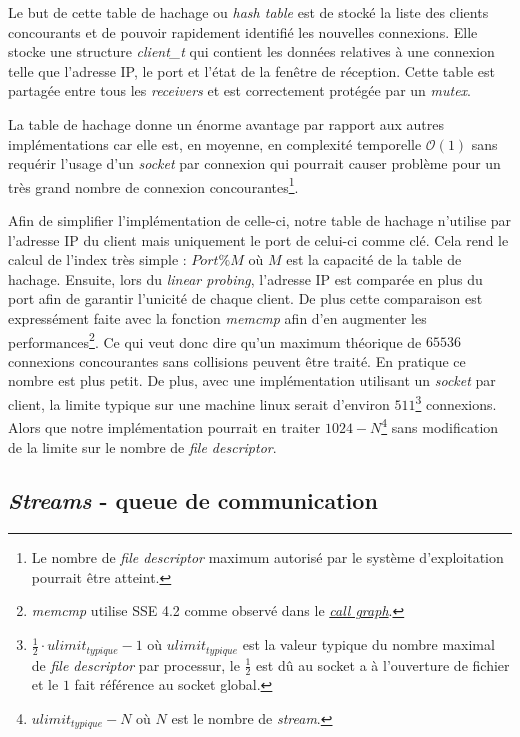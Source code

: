 \documentclass[../main.tex]{subfiles}
\begin{document}
Le but de cette table de hachage ou \textit{hash table} est de stocké la liste des clients concourants et de pouvoir rapidement identifié les nouvelles
connexions. Elle stocke une structure \textit{client\_t} qui contient les données relatives à une connexion telle que l'adresse IP, le port et l'état
de la fenêtre de réception. Cette table est partagée entre tous les \textit{receivers} et est correctement protégée par un \textit{mutex}.

La table de hachage donne un énorme avantage par rapport aux autres implémentations car elle est, en moyenne, en complexité temporelle $\mathcal{O}(1)$
sans requérir l'usage d'un \textit{socket} par connexion qui pourrait causer problème pour un très grand nombre de connexion concourantes\footnote{
    Le nombre de \textit{file descriptor} maximum autorisé par le système d'exploitation pourrait être atteint.}.

Afin de simplifier l'implémentation de celle-ci, notre table de hachage n'utilise par l'adresse IP du client mais uniquement le port de celui-ci comme
clé. Cela rend le calcul de l'index très simple : $Port \% M$ où $M$ est la capacité de la table de hachage. Ensuite, lors du \textit{linear probing},
l'adresse IP est comparée en plus du port afin de garantir l'unicité de chaque client. De plus cette comparaison est expressément faite avec
la fonction \textit{memcmp} afin d'en augmenter les performances\footnote{ \textit{memcmp} utilise SSE 4.2 comme observé dans le \textit{\hyperref[sec:annexs_call_graph]{call graph}}.}.
Ce qui veut donc dire qu'un maximum théorique de $65536$ connexions concourantes sans collisions peuvent être traité. En pratique ce nombre
est plus petit. De plus, avec une implémentation utilisant un \textit{socket} par client, la limite typique sur une machine linux serait
d'environ $511$\footnote{ $\frac{1}{2} \cdot ulimit_{typique} - 1$ où $ulimit_{typique}$ est la valeur typique du nombre maximal de \textit{file descriptor} par processur,
 le $\frac{1}{2}$ est dû au socket a à l'ouverture de fichier et le $1$ fait référence au socket global. } connexions. Alors
que notre implémentation pourrait en traiter $1024 - N$\footnote{ $ulimit_{typique} - N$ où $N$ est le nombre de \textit{stream}.} sans modification de la limite sur le nombre de \textit{file descriptor}.

\newpage

\subsection{\textit{Streams} - queue de communication}
\label{sec:steams}
\end{document}
